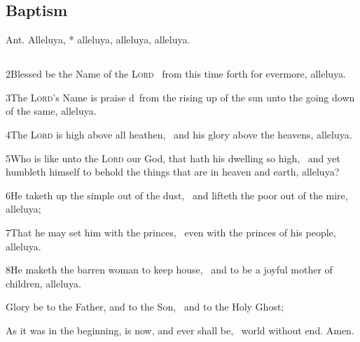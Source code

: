 \subsection{Baptism}

Ant. Alleluya, * alleluya, alleluya, alleluya.

\subsection[{Psalm 113}]{}

2\enspace Blessed be the Name of the {\scshape Lord} \star\  from this time forth for evermore, alleluya.

3\enspace The {\scshape Lord}’s Name is praise d\star\  from the rising up of the sun unto the going down of the same, alleluya.

4\enspace The {\scshape Lord} is high above all heathen, \star\  and his glory above the heavens, alleluya.

5\enspace Who is like unto the {\scshape Lord} our God, that hath his dwelling so high, \star\  and yet humbleth himself 
to behold the things that are in heaven and earth, alleluya?

6\enspace He taketh up the simple out of the dust, \star\  and lifteth the poor out of the mire, alleluya;

7\enspace That he may set him with the princes, \star\  even with the princes of his people, alleluya.

8\enspace He maketh the barren woman to keep house, \star\  and to be a joyful mother of children, alleluya.

Glory be to the Father, and to the Son, \star\  and to the Holy Ghost;

As it was in the beginning, is now, and ever shall be, \star\  world without end. Amen.

\centerline{}


\medskip

